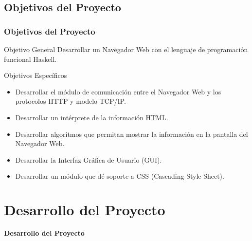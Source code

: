 \documentclass[12pt]{beamer}
\begin{document}
\subsection{Objetivos del Proyecto}
\begin{frame}
\frametitle{Objetivos del Proyecto}

\begin{block}{Objetivo General}
Desarrollar un Navegador Web con el lenguaje de programación funcional Haskell.\\
\end{block}

\begin{block}{Objetivos Específicos}
\begin{itemize}
	\item Desarrollar el módulo de comunicación entre el Navegador Web y los
	protocolos HTTP y modelo TCP/IP.
	\item Desarrollar un intérprete de la información HTML.
	\item Desarrollar algoritmos que permitan mostrar la información en la pantalla
	del Navegador Web.
	\item Desarrollar la Interfaz Gráfica de Usuario (GUI).
	\item Desarrollar un módulo que dé soporte a CSS (Cascading Style Sheet).
\end{itemize}
\end{block}

\end{frame}


\section[Desarrollo]{Desarrollo del Proyecto}

\begin{frame}
\begin{center}
	\textbf{\Large Desarrollo del Proyecto}
\end{center}
\end{frame}
\end{document}
